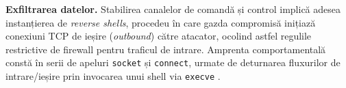 \par \textbf{Exfiltrarea datelor.} Stabilirea canalelor de comandă și control implică adesea instanțierea de \textit{reverse shells}, procedeu în care gazda compromisă inițiază conexiuni TCP de ieșire (\textit{outbound}) către atacator, ocolind astfel regulile restrictive de firewall pentru traficul de intrare. Amprenta comportamentală constă în serii de apeluri \texttt{socket} și \texttt{connect}, urmate de deturnarea fluxurilor de intrare/ieșire prin invocarea unui shell via \texttt{execve} \cite{Cozzi2018}.